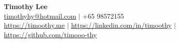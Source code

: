 \documentclass[11pt,letterpaper]{article}
\begin{document}
\newcommand{\ressubheadingfirst}[4]{
    \vspace{-6pt}
    \begin{tabular*}{\textwidth}{l@{\extracolsep{\fill}}r}
        \small \textbf{#1} & \small #2 \\
        \small \textit{#3} & \small \textit{#4} \\
    \end{tabular*}\vspace{-3pt}}

\newenvironment{leftitemize}{%
  \begin{list}{--}{%
    \setlength{\leftmargin}{0pt}%
    \setlength{\itemindent}{0pt}%
    \setlength{\labelsep}{0.5em}%
    \setlength{\labelwidth}{0.5em}%
  }%
}{%
  \end{list}%
}

\newenvironment{subitemize}{%
  \begin{list}{--}{%
    \setlength{\leftmargin}{18pt}%
    \setlength{\itemindent}{0pt}%
    \setlength{\labelsep}{0.5em}%
    \setlength{\labelwidth}{0.5em}%
  }%
}{%
  \end{list}%
}

\newcommand{\resprojectfirst}[2]{
    \vspace{-2pt}
    \begin{tabular*}{\textwidth}{l@{\extracolsep{\fill}}r}
        \small \textbf{#1} & \small #2 \\
    \end{tabular*}\vspace{-2pt}}

\newcommand{\resproject}[2]{
    \vspace{2pt}
    \begin{tabular*}{\textwidth}{l@{\extracolsep{\fill}}r}
        \small \textbf{#1} & \small #2 \\
    \end{tabular*}\vspace{-2pt}}

\begin{center}
{\Large \textbf{Timothy Lee}}\\
\vspace{2pt}
\small \href{mailto:timothyhy@hotmail.com}{timothyhy@hotmail.com} $|$ +65 98572155\\
\small \href{https://timoothy.me}{https://timoothy.me} $|$ \href{https://linkedin.com/in/timoothy}{https://linkedin.com/in/timoothy} $|$ \href{https://github.com/timooo-thy}{https://github.com/timooo-thy}
\end{center}
\vspace{3pt}
\end{document}
